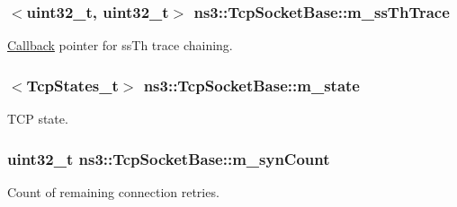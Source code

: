 \subsubsection[{\texorpdfstring{m\+\_\+ss\+Th\+Trace}{m_ssThTrace}}]{$<$uint32\+\_\+t, uint32\+\_\+t$>$ ns3\+::\+Tcp\+Socket\+Base\+::m\+\_\+ss\+Th\+Trace}\hypertarget{classns3_1_1TcpSocketBase_aba33c4aa346eeb1a205a97844d8ed689}{}\label{classns3_1_1TcpSocketBase_aba33c4aa346eeb1a205a97844d8ed689}


\hyperlink{classns3_1_1Callback}{Callback} pointer for ss\+Th trace chaining. 

\subsubsection[{\texorpdfstring{m\+\_\+state}{m_state}}]{$<${\bf Tcp\+States\+\_\+t}$>$ ns3\+::\+Tcp\+Socket\+Base\+::m\+\_\+state\hspace{0.3cm}{\ttfamily [protected]}}\hypertarget{classns3_1_1TcpSocketBase_a5db6f29272f23546e23320c06a681f3e}{}\label{classns3_1_1TcpSocketBase_a5db6f29272f23546e23320c06a681f3e}


T\+CP state. 

\subsubsection[{\texorpdfstring{m\+\_\+syn\+Count}{m_synCount}}]{\setlength{\rightskip}{0pt plus 5cm}uint32\+\_\+t ns3\+::\+Tcp\+Socket\+Base\+::m\+\_\+syn\+Count\hspace{0.3cm}{\ttfamily [protected]}}\hypertarget{classns3_1_1TcpSocketBase_addf20037951e7b85435a97d8885ea844}{}\label{classns3_1_1TcpSocketBase_addf20037951e7b85435a97d8885ea844}


Count of remaining connection retries. 

